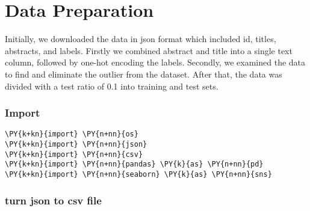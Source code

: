 \documentclass[../main.tex]{subfiles}
\begin{document}
\chapter{Data Preparation}   
Initially, we downloaded the data in json format which included id, titles, abstracts, and labels. 
Firstly we combined abstract and title into a single text column, followed by one-hot encoding the labels. 
Secondly, we examined the data to find and eliminate the outlier from the dataset.  
After that, the data was divided with a test ratio of 0.1 into training and test sets.
\vspace{0.2in}

    \subsection{Import}\label{import}

    \begin{tcolorbox}[breakable, size=fbox, boxrule=1pt, pad at break*=1mm,colback=cellbackground, colframe=cellborder]
\begin{Verbatim}[commandchars=\\\{\}]
\PY{k+kn}{import} \PY{n+nn}{os}
\PY{k+kn}{import} \PY{n+nn}{json}
\PY{k+kn}{import} \PY{n+nn}{csv}
\PY{k+kn}{import} \PY{n+nn}{pandas} \PY{k}{as} \PY{n+nn}{pd}
\PY{k+kn}{import} \PY{n+nn}{seaborn} \PY{k}{as} \PY{n+nn}{sns}
\end{Verbatim}
\end{tcolorbox}

    \subsection{turn json to csv file}\label{turn-json-to-csv-file}
\end{document}
